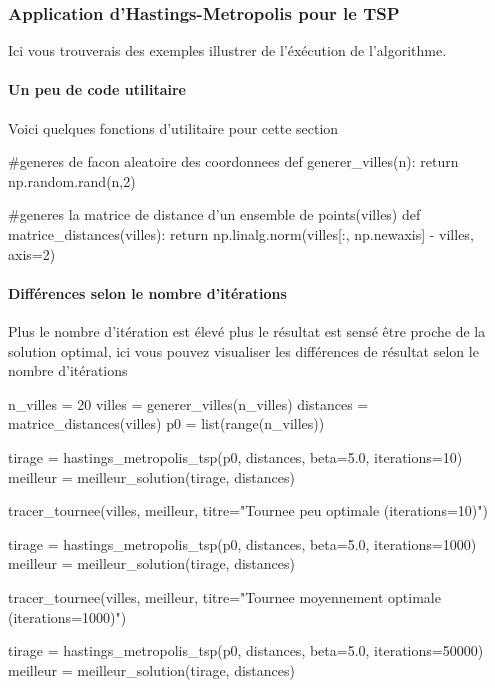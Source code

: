 \documentclass{article}
\begin{document}
\subsubsection{Application d'Hastings-Metropolis pour le TSP}

Ici vous trouverais des exemples illustrer de l'éxécution de l'algorithme.

\paragraph{Un peu de code utilitaire}

Voici quelques fonctions d'utilitaire pour cette section

\begin{center}
\begin{python}

#generes de facon aleatoire des coordonnees 
def generer_villes(n):
    return np.random.rand(n,2)

#generes la matrice de distance d'un ensemble de points(villes) 
def matrice_distances(villes):
    return np.linalg.norm(villes[:, np.newaxis] - villes, axis=2)

\end{python}
\end{center}

\paragraph{Différences selon le nombre d'itérations}

Plus le nombre d'itération est élevé plus le résultat est sensé être proche de la solution optimal, 
ici vous pouvez visualiser les différences de résultat selon le nombre d'itérations

\begin{center}
\begin{python}
n_villes = 20
villes = generer_villes(n_villes)
distances = matrice_distances(villes)
p0 = list(range(n_villes))


tirage = hastings_metropolis_tsp(p0, distances, beta=5.0, iterations=10)
meilleur = meilleur_solution(tirage, distances)

tracer_tournee(villes, meilleur, titre="Tournee peu optimale (iterations=10)")


tirage = hastings_metropolis_tsp(p0, distances, beta=5.0, iterations=1000)
meilleur = meilleur_solution(tirage, distances)

tracer_tournee(villes, meilleur, titre="Tournee moyennement optimale (iterations=1000)")

tirage = hastings_metropolis_tsp(p0, distances, beta=5.0, iterations=50000)
meilleur = meilleur_solution(tirage, distances)
\end{python}
\end{center}
\end{document}
